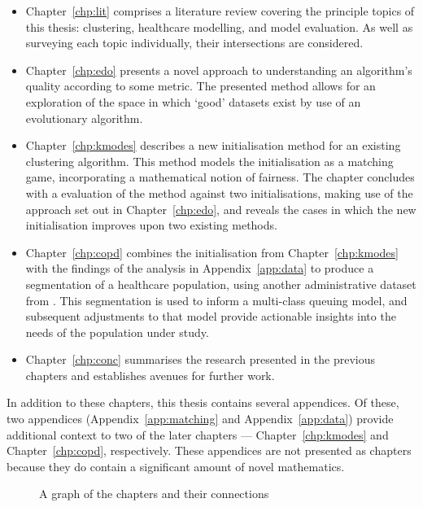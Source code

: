 \begin{itemize}
    \item Chapter~\ref{chp:lit} comprises a literature review covering the
        principle topics of this thesis: clustering, healthcare modelling, and
        model evaluation. As well as surveying each topic individually, their
        intersections are considered.
    \item Chapter~\ref{chp:edo} presents a novel approach to understanding an
        algorithm's quality according to some metric. The presented method
        allows for an exploration of the space in which `good' datasets exist
        by use of an evolutionary algorithm.
    \item Chapter~\ref{chp:kmodes} describes a new initialisation method for an
        existing clustering algorithm. This method models the initialisation as
        a matching game, incorporating a mathematical notion of fairness. The
        chapter concludes with a evaluation of the method against two
        initialisations, making use of the approach set out in
        Chapter~\ref{chp:edo}, and reveals the cases in which the new
        initialisation improves upon two existing methods.
    \item Chapter~\ref{chp:copd} combines the initialisation from
        Chapter~\ref{chp:kmodes} with the findings of the analysis in
        Appendix~\ref{app:data} to produce a segmentation of a healthcare
        population, using another administrative dataset from \ctmuhb. This
        segmentation is used to inform a multi-class queuing model, and
        subsequent adjustments to that model provide actionable insights into
        the needs of the population under study.
    \item Chapter~\ref{chp:conc} summarises the research presented in the
        previous chapters and establishes avenues for further work.
\end{itemize}

In addition to these chapters, this thesis contains several appendices. Of
these, two appendices (Appendix~\ref{app:matching} and Appendix~\ref{app:data})
provide additional context to two of the later chapters ---
Chapter~\ref{chp:kmodes} and Chapter~\ref{chp:copd}, respectively. These
appendices are not presented as chapters because they do contain a significant
amount of novel mathematics.

\begin{figure}[htbp]
    \centering%
    \resizebox{\imgwidth}{!}{%
    
    }
    \caption{A graph of the chapters and their connections}\label{fig:structure}
\end{figure}

